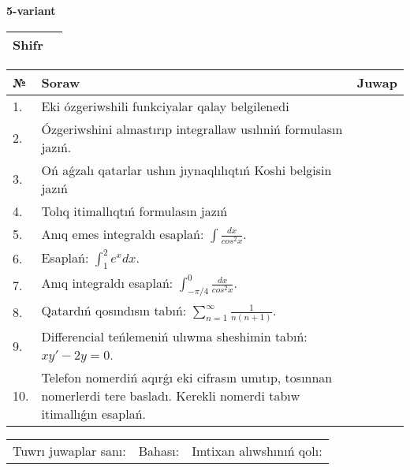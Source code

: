 \documentclass{article}
\begin{document}
  \egroup
  
  \newpage
  
  
  \textbf{5-variant}\\
  
  \bgroup
  \def\arraystretch{1.6} %
  
  \begin{tabular}{|m{5.7cm}|m{9.5cm}|}
  \hline
  Shifr & \\
  \hline
  \end{tabular}
  
  \vspace{1cm}
  
  \begin{tabular}{|m{0.7cm}|m{10cm}|m{4cm}|}
  \hline
  № & Soraw & Juwap \\
  \hline
  1. & Eki ózgeriwshili funkciyalar qalay belgilenedi &  \\
  \hline
  2. & Ózgeriwshini almastırıp integrallaw usılıniń formulasın jazıń. &  \\
  \hline
  3. & Oń aǵzalı qatarlar ushın jıynaqlılıqtıń Koshi belgisin jazıń &  \\
  \hline
  4. & Tolıq itimallıqtıń formulasın jazıń &  \\
  \hline
  5. & Anıq emes integraldı esaplań: \(\int\frac{dx}{cos^2 x}\). &  \\
  \hline
  6. & Esaplań: \(\int_{1}^2 {e^{x}dx}\). &  \\
  \hline
  7. & Anıq integraldı esaplań: \(\int_{- \pi/4}^{0}\frac{dx}{cos^2 x}\). &  \\
  \hline
  8. & Qatardıń qosındısın tabıń: \(\sum_{n = 1}^{\infty}\frac{1}{n(n + 1)}\). &  \\
  \hline
  9. & Differencial teńlemeniń ulıwma sheshimin tabıń: \(xy' - 2y = 0\). &  \\
  \hline
  10. & Telefon nomerdiń aqırǵı eki cifrasın umıtıp, tosınnan nomerlerdi tere basladı. Kerekli nomerdi tabıw itimallıǵın esaplań. &  \\
  \hline
  \end{tabular}
  
  \vspace{1cm}
  
  \begin{tabular}{lll}
  Tuwrı juwaplar sanı: \underline{\hspace{1.5cm}} & 
  Bahası: \underline{\hspace{1.5cm}} & 
  Imtixan alıwshınıń qolı: \underline{\hspace{2cm}} \\
  \end{tabular}
  
\end{document}
